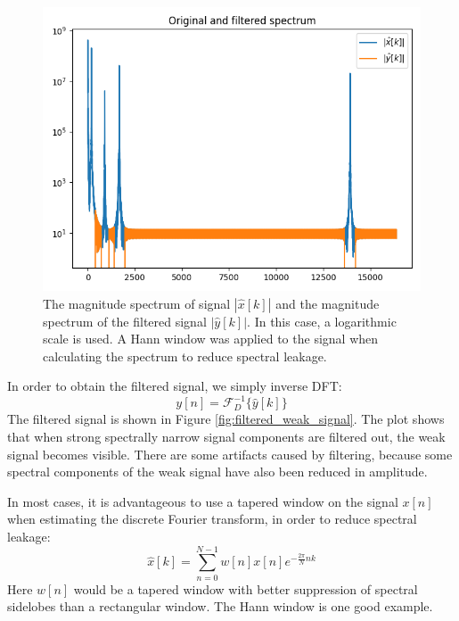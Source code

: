 \begin{figure}
  \begin{center}
    \includegraphics[width=\textwidth]{code/024_fft_filter/filter_spec.png}
  \end{center}
  \caption{The magnitude spectrum of signal $|\hat{x}[k]|$ and the
    magnitude spectrum of the filtered signal $|\hat{y}[k]|$. In this
    case, a logarithmic scale is used. A Hann window was applied to the
    signal when calculating the spectrum to reduce spectral leakage.}
  \label{fig:example_spec_filter_strong}
\end{figure}

In order to obtain the filtered signal, we simply inverse DFT:
\begin{equation}
  y[n]=\mathcal{F}_D^{-1}\{\hat{y}[k]\}
\end{equation}
The filtered signal is shown in Figure
\ref{fig:filtered_weak_signal}. The plot shows that when strong
spectrally narrow signal components are filtered out, the weak signal
becomes visible. There are some artifacts caused by filtering, because
some spectral components of the weak signal have also been
reduced in amplitude.

In most cases, it is advantageous to use a tapered window on the signal
$x[n]$ when estimating the discrete Fourier transform, in order to reduce spectral leakage:
\begin{equation}
  \hat{x}[k]= \sum_{n=0}^{N-1} w[n]x[n]e^{-\frac{2\pi}{N}nk}
\end{equation}
Here $w[n]$ would be a tapered window with better suppression of
spectral sidelobes than a rectangular window. The Hann window is one
good example.

